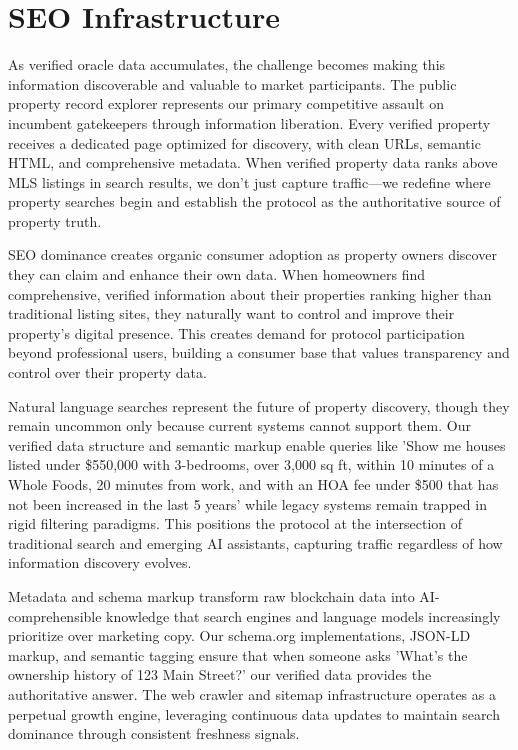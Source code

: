 \section{SEO Infrastructure}

As verified oracle data accumulates, the challenge becomes making this information discoverable and valuable to market participants. The public property record explorer represents our primary competitive assault on incumbent gatekeepers through information liberation. Every verified property receives a dedicated page optimized for discovery, with clean URLs, semantic HTML, and comprehensive metadata. When verified property data ranks above MLS listings in search results, we don't just capture traffic---we redefine where property searches begin and establish the protocol as the authoritative source of property truth.

SEO dominance creates organic consumer adoption as property owners discover they can claim and enhance their own data. When homeowners find comprehensive, verified information about their properties ranking higher than traditional listing sites, they naturally want to control and improve their property's digital presence. This creates demand for protocol participation beyond professional users, building a consumer base that values transparency and control over their property data.

Natural language searches represent the future of property discovery, though they remain uncommon only because current systems cannot support them. Our verified data structure and semantic markup enable queries like 'Show me houses listed under \$550,000 with 3-bedrooms, over 3,000 sq ft, within 10 minutes of a Whole Foods, 20 minutes from work, and with an HOA fee under \$500 that has not been increased in the last 5 years' while legacy systems remain trapped in rigid filtering paradigms. This positions the protocol at the intersection of traditional search and emerging AI assistants, capturing traffic regardless of how information discovery evolves.

Metadata and schema markup transform raw blockchain data into AI-comprehensible knowledge that search engines and language models increasingly prioritize over marketing copy. Our schema.org implementations, JSON-LD markup, and semantic tagging ensure that when someone asks 'What's the ownership history of 123 Main Street?' our verified data provides the authoritative answer. The web crawler and sitemap infrastructure operates as a perpetual growth engine, leveraging continuous data updates to maintain search dominance through consistent freshness signals.


